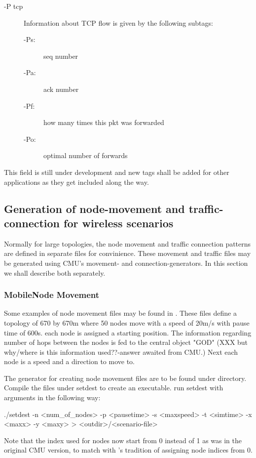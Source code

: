 \begin{description}
\begin{description}
\item[-P tcp] Information about TCP flow is given by the following
subtags:

\begin{description}
\item[-Ps:] seq number
\item[-Pa:] ack number
\item[-Pf:] how many times this pkt was forwarded
\item[-Po:] optimal number of forwards 
\end{description}
\end{description}

This field is still under development and new tags shall be added for
other applications as they get included along the way.
\end{description}


\subsection{Generation of node-movement and traffic-connection for
  wireless scenarios}
\label{sec:mobile-scen-generator}

Normally for large topologies, the node movement and traffic connection
patterns are defined in separate files for convinience. These movement and
traffic files may be generated using CMU's movement- and
connection-generators. In this section we shall describe both separately.

\subsubsection{MobileNode Movement}
\label{sec:mobile-movement-file}

Some examples of node movement files may be found in
. These files
define a topology of 670 by 670m where 50 nodes move with a speed of 20m/s
with pause time of 600s. each node is assigned a starting position. The
information regarding number of hops between the nodes is fed to the
central object "GOD" (XXX but why/where is this information used??-answer
awaited from CMU.) Next each node is a speed and a direction to move to. 

The generator for creating node movement files are to be found under
 directory. Compile the files
under setdest to create an executable. run setdest with arguments in
the following way:
\begin{program}
./setdest -n <num_of_nodes> -p <pausetime> -s <maxspeed> -t <simtime>
          -x <maxx> -y <maxy> > <outdir>/<scenario-file>
\end{program}
Note that the index used for nodes now start from 0 instead of 1 as
was in the original CMU version, to match with \ns's tradition of
assigning node indices from 0.



